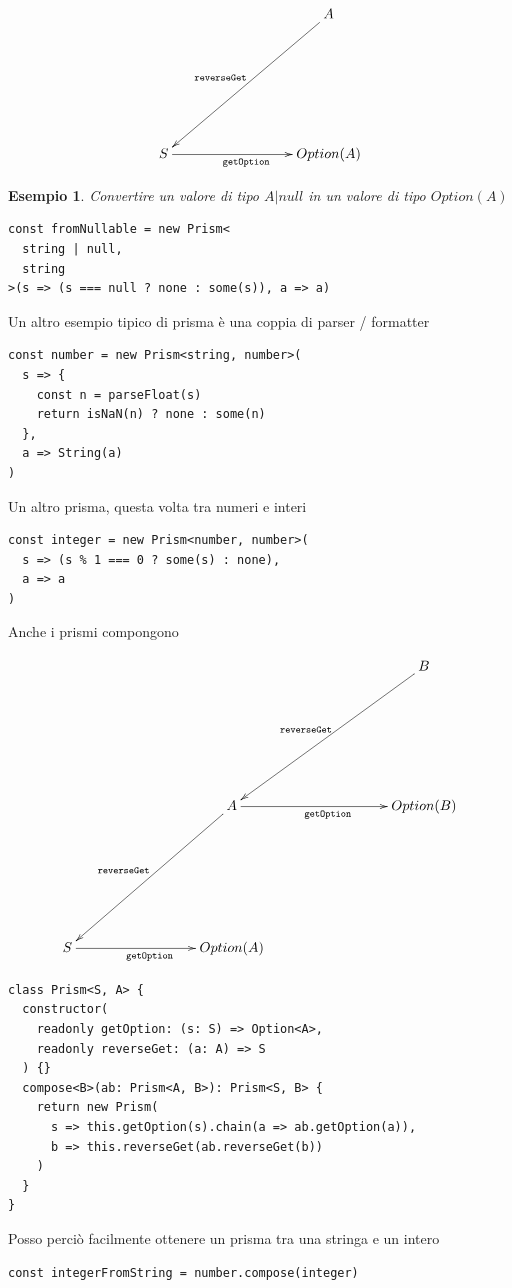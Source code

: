 \documentclass[12pt]{article}
\newtheorem{example}{Esempio}[section]
\begin{document}
\[
\xymatrixrowsep{3cm}
\xymatrixcolsep{3cm}
\xymatrix{
  & A \ar[dl]_{\texttt{reverseGet}} \\
  S \ar[r]_{\texttt{getOption}} & {Option(A)}
}
\]

\begin{example}
Convertire un valore di tipo $A | null$ in un valore di tipo $Option(A)$

\begin{verbatim}
const fromNullable = new Prism<
  string | null,
  string
>(s => (s === null ? none : some(s)), a => a)
\end{verbatim}

\end{example}

Un altro esempio tipico di prisma è una coppia di parser / formatter

\begin{verbatim}
const number = new Prism<string, number>(
  s => {
    const n = parseFloat(s)
    return isNaN(n) ? none : some(n)
  },
  a => String(a)
)
\end{verbatim}

Un altro prisma, questa volta tra numeri e interi

\begin{verbatim}
const integer = new Prism<number, number>(
  s => (s % 1 === 0 ? some(s) : none),
  a => a
)
\end{verbatim}

Anche i prismi compongono

\[
\xymatrixrowsep{3cm}
\xymatrixcolsep{3cm}
\xymatrix{
  & & B \ar[dl]_{\texttt{reverseGet}} \\
  & A \ar[dl]_{\texttt{reverseGet}} \ar[r]_{\texttt{getOption}} & {Option(B)} \\
  S \ar[r]_{\texttt{getOption}} & {Option(A)}
}
\]

\begin{verbatim}
class Prism<S, A> {
  constructor(
    readonly getOption: (s: S) => Option<A>,
    readonly reverseGet: (a: A) => S
  ) {}
  compose<B>(ab: Prism<A, B>): Prism<S, B> {
    return new Prism(
      s => this.getOption(s).chain(a => ab.getOption(a)),
      b => this.reverseGet(ab.reverseGet(b))
    )
  }
}
\end{verbatim}

Posso perciò facilmente ottenere un prisma tra una stringa e un intero

\begin{verbatim}
const integerFromString = number.compose(integer)
\end{verbatim}
\end{document}
